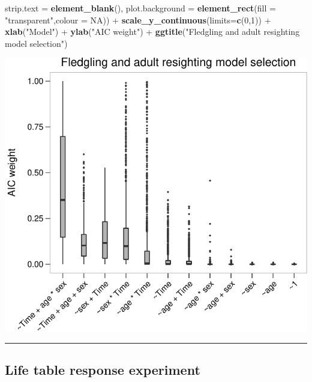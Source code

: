 \documentclass[]{article}
\newenvironment{Shaded}{\begin{snugshade}}{\end{snugshade}}
\newcommand{\KeywordTok}[1]{\textcolor[rgb]{0.13,0.29,0.53}{\textbf{{#1}}}}
\newcommand{\DataTypeTok}[1]{\textcolor[rgb]{0.13,0.29,0.53}{{#1}}}
\newcommand{\DecValTok}[1]{\textcolor[rgb]{0.00,0.00,0.81}{{#1}}}
\newcommand{\StringTok}[1]{\textcolor[rgb]{0.31,0.60,0.02}{{#1}}}
\newcommand{\OtherTok}[1]{\textcolor[rgb]{0.56,0.35,0.01}{{#1}}}
\newcommand{\NormalTok}[1]{{#1}}
\begin{document}
\begin{Shaded}
\begin{Highlighting}[]
                \DataTypeTok{strip.text =} \KeywordTok{element_blank}\NormalTok{(),}
                \DataTypeTok{plot.background =} \KeywordTok{element_rect}\NormalTok{(}\DataTypeTok{fill =} \StringTok{"transparent"}\NormalTok{,}\DataTypeTok{colour =} \OtherTok{NA}\NormalTok{)) +}
\StringTok{          }\KeywordTok{scale_y_continuous}\NormalTok{(}\DataTypeTok{limits=}\KeywordTok{c}\NormalTok{(}\DecValTok{0}\NormalTok{,}\DecValTok{1}\NormalTok{)) +}
\StringTok{          }\KeywordTok{xlab}\NormalTok{(}\StringTok{"Model"}\NormalTok{) +}\StringTok{ }
\StringTok{          }\KeywordTok{ylab}\NormalTok{(}\StringTok{"AIC weight"}\NormalTok{) +}
\StringTok{          }\KeywordTok{ggtitle}\NormalTok{(}\StringTok{"Fledgling and adult resighting model selection"}\NormalTok{)}
\end{Highlighting}
\end{Shaded}

\begin{center}\includegraphics{Ceuta_ASR_Matrix_Modeling_files/figure-latex/unnamed-chunk-58-1} \end{center}

\begin{center}\rule{0.5\linewidth}{\linethickness}\end{center}

\subsection{Life table response
experiment}\label{life-table-response-experiment}
\end{document}
